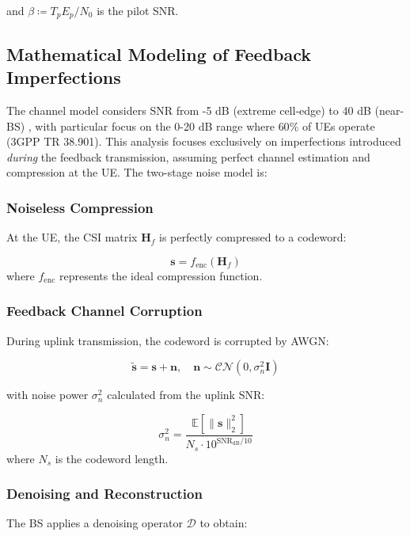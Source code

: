\documentclass[lettersize,journal]{IEEEtran}
\begin{document}
\noindent and $\beta \coloneqq T_p E_p/N_0$ is the pilot SNR. 


\subsection{Mathematical Modeling of Feedback Imperfections}
\label{subsec:feedback_noise}
The channel model considers SNR from -5 dB (extreme cell-edge) to 40 dB (near-BS) , with particular focus on the 0-20 dB range where $60\%$ of UEs operate (3GPP TR 38.901).
This analysis focuses exclusively on imperfections introduced \textit{during} the feedback transmission, assuming perfect channel estimation and compression at the UE. The two-stage noise model is:

\subsubsection{Noiseless Compression}
At the UE, the CSI matrix $\mathbf{H}_f$ is perfectly compressed to a codeword:

\begin{equation}
    \mathbf{s} = f_{\text{enc}}(\mathbf{H}_f)
\end{equation}
where $f_{\text{enc}}$ represents the ideal compression function.

\subsubsection{Feedback Channel Corruption}
During uplink transmission, the codeword is corrupted by AWGN:

\begin{equation}
    \tilde{\mathbf{s}} = \mathbf{s} + \mathbf{n}, \quad \mathbf{n} \sim \mathcal{CN}(0,\sigma_n^2\mathbf{I})
    \label{eq:noisy_feedback}
\end{equation}

with noise power $\sigma_n^2$ calculated from the uplink SNR:

\begin{equation}
    \sigma_n^2 = \frac{\mathbb{E}[\|\mathbf{s}\|_2^2]}{N_s \cdot 10^{\text{SNR}_{\text{dB}}/10}}
\end{equation}
where $N_s$ is the codeword length.

\subsubsection{Denoising and Reconstruction}
The BS applies a denoising operator $\mathcal{D}$ to obtain:
\end{document}
